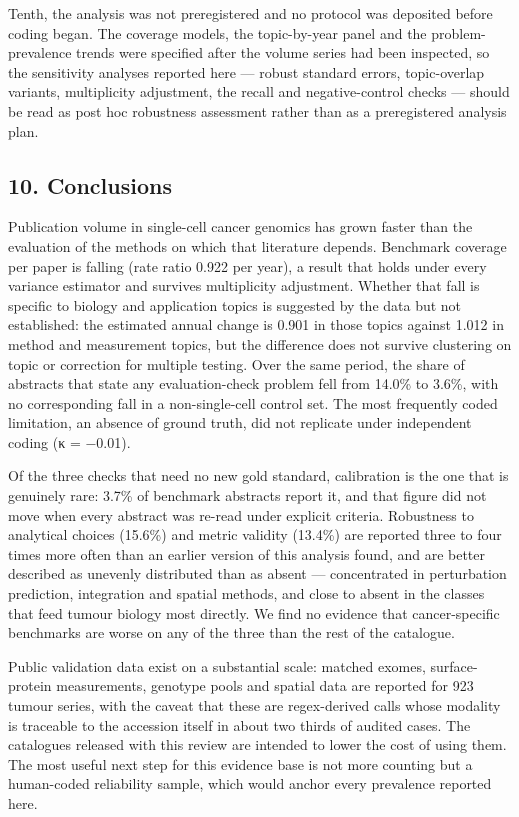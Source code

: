\documentclass[11pt]{article}
\begin{document}
Tenth, the analysis was not preregistered and no protocol was deposited
before coding began. The coverage models, the topic-by-year panel and
the problem-prevalence trends were specified after the volume series had
been inspected, so the sensitivity analyses reported here --- robust
standard errors, topic-overlap variants, multiplicity adjustment, the
recall and negative-control checks --- should be read as post hoc
robustness assessment rather than as a preregistered analysis plan.

\subsection{10. Conclusions}\label{conclusions}

Publication volume in single-cell cancer genomics has grown faster than
the evaluation of the methods on which that literature depends.
Benchmark coverage per paper is falling (rate ratio 0.922 per year), a
result that holds under every variance estimator and survives
multiplicity adjustment. Whether that fall is specific to biology and
application topics is suggested by the data but not established: the
estimated annual change is 0.901 in those topics against 1.012 in method
and measurement topics, but the difference does not survive clustering
on topic or correction for multiple testing. Over the same period, the
share of abstracts that state any evaluation-check problem fell from
14.0\% to 3.6\%, with no corresponding fall in a non-single-cell control
set. The most frequently coded limitation, an absence of ground truth,
did not replicate under independent coding (κ = −0.01).

Of the three checks that need no new gold standard, calibration is the
one that is genuinely rare: 3.7\% of benchmark abstracts report it, and
that figure did not move when every abstract was re-read under explicit
criteria. Robustness to analytical choices (15.6\%) and metric validity
(13.4\%) are reported three to four times more often than an earlier
version of this analysis found, and are better described as unevenly
distributed than as absent --- concentrated in perturbation prediction,
integration and spatial methods, and close to absent in the classes that
feed tumour biology most directly. We find no evidence that
cancer-specific benchmarks are worse on any of the three than the rest
of the catalogue.

Public validation data exist on a substantial scale: matched exomes,
surface-protein measurements, genotype pools and spatial data are
reported for 923 tumour series, with the caveat that these are
regex-derived calls whose modality is traceable to the accession itself
in about two thirds of audited cases. The catalogues released with this
review are intended to lower the cost of using them. The most useful
next step for this evidence base is not more counting but a human-coded
reliability sample, which would anchor every prevalence reported here.
\end{document}
